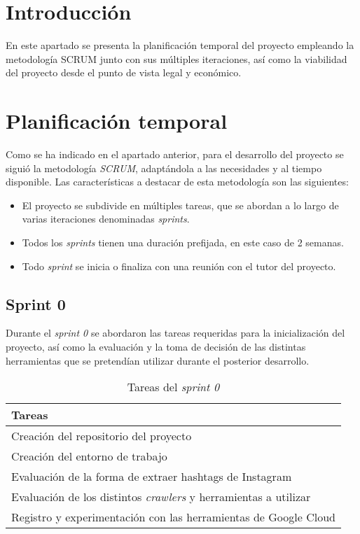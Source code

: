 
\section{Introducción}

En este apartado se presenta la planificación temporal del proyecto empleando la metodología SCRUM junto con sus múltiples iteraciones, así como la viabilidad del proyecto desde el punto de vista legal y económico.

\section{Planificación temporal}

Como se ha indicado en el apartado anterior, para el desarrollo del proyecto se siguió la metodología \textit{SCRUM}, adaptándola a las necesidades y al tiempo disponible. Las características a destacar de esta metodología son las siguientes:

\begin{itemize}
    \item El proyecto se subdivide en múltiples tareas, que se abordan a lo largo de varias iteraciones denominadas \textit{sprints}.
    \item Todos los \textit{sprints} tienen una duración prefijada, en este caso de 2 semanas.
    \item Todo \textit{sprint} se inicia o finaliza con una reunión con el tutor del proyecto.
\end{itemize}

\subsection{Sprint 0}
Durante el \textit{sprint 0} se abordaron las tareas requeridas para la inicialización del proyecto, así como la evaluación y la toma de decisión de las distintas herramientas que se pretendían utilizar durante el posterior desarrollo.

\begin{table}[H]
    \centering
    \begin{tabular}{l}
    \hline
    \textbf{Tareas} \\ \hline
    Creación del repositorio del proyecto \\
    Creación del entorno de trabajo \\
    Evaluación de la forma de extraer hashtags de Instagram \\
    Evaluación de los distintos \textit{crawlers} y herramientas a utilizar \\
    Registro y experimentación con las herramientas de Google Cloud \\ \hline
    \end{tabular}
    \caption{Tareas del \textit{sprint 0}}
    \label{tab:tasks_sprint0}
\end{table}


